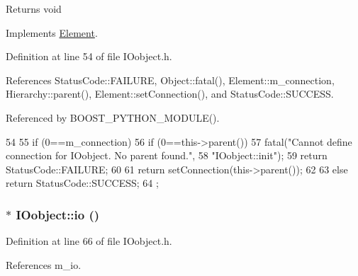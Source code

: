 \begin{DoxyReturn}{Returns}
void 
\end{DoxyReturn}


Implements \hyperlink{classElement_af42754b5cabc198869222725218d695c}{Element}.

Definition at line 54 of file IOobject.h.

References StatusCode::FAILURE, Object::fatal(), Element::m\_\-connection, Hierarchy::parent(), Element::setConnection(), and StatusCode::SUCCESS.

Referenced by BOOST\_\-PYTHON\_\-MODULE().


\begin{DoxyCode}
54                             {
55     if (0==m_connection){
56       if (0==this->parent()){
57         fatal("Cannot define connection for IOobject. No parent found.",
58             "IOobject::init");
59           return StatusCode::FAILURE;
60       }
61       return setConnection(this->parent());
62     }
63     else return StatusCode::SUCCESS;
64   };
\end{DoxyCode}
\hypertarget{classIOobject_af04fb94137c3d86849f478ac5afab5d1}{
\subsubsection[{io}]{$\ast$ IOobject::io ()}}
\label{classIOobject_af04fb94137c3d86849f478ac5afab5d1}


Definition at line 66 of file IOobject.h.

References m\_\-io.

